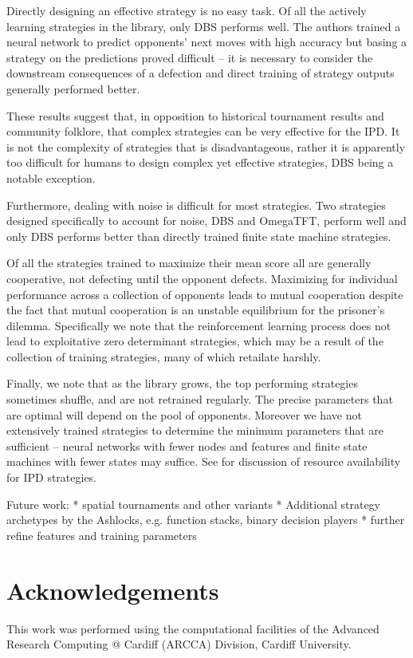 \documentclass{article}
\begin{document}
Directly designing an effective strategy is no easy task. Of all the actively
learning strategies in the library, only DBS performs well. The authors trained
a neural network to predict opponents' next moves with high accuracy but basing
a strategy on the predictions proved difficult -- it is necessary to consider
the downstream consequences of a defection and direct training of strategy
outputs generally performed better.

These results suggest that, in opposition to historical tournament results
and community folklore, that complex strategies can be very effective for the
IPD. It is not the complexity of strategies that is disadvantageous, rather it
is apparently too difficult for humans to design complex yet effective
strategies, DBS being a notable exception.

Furthermore, dealing with noise is difficult for most strategies. Two strategies
designed specifically to account for noise, DBS and OmegaTFT, perform well and
only DBS performs better than directly trained finite state machine strategies.

Of all the strategies trained to maximize their mean score all are generally
cooperative, not defecting until the opponent defects. Maximizing for individual
performance across a collection of opponents leads to mutual cooperation despite
the fact that mutual cooperation is an unstable equilibrium for the prisoner's
dilemma. Specifically we note that the reinforcement learning process does not
lead to exploitative zero determinant strategies, which may be a result of the
collection of training strategies, many of which retailate harshly.

Finally, we note that as the library grows, the top performing strategies
sometimes shuffle, and are not retrained regularly. The precise parameters
that are optimal will depend on the pool of opponents. Moreover we have not
extensively trained strategies to determine the minimum parameters that are
sufficient -- neural networks with fewer nodes and features and finite state
machines with fewer states may suffice. See \cite{ashlock2013impact} for
discussion of resource availability for IPD strategies.


Future work:
* spatial tournaments and other variants
* Additional strategy archetypes by the Ashlocks, e.g. function stacks, binary
decision players
* further refine features and training parameters


\section*{Acknowledgements}

This work was performed using the computational facilities of the Advanced
Research Computing @ Cardiff (ARCCA) Division, Cardiff University.

\printbibliography
\end{document}
